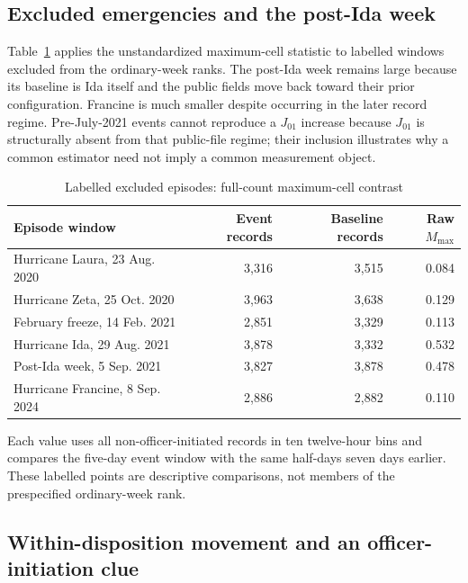 \documentclass[11pt]{article}
\begin{document}
\subsection{Excluded emergencies and the post-Ida week}

Table~\ref{tab:episodes} applies the unstandardized maximum-cell statistic to labelled windows excluded from the ordinary-week ranks. The post-Ida week remains large because its baseline is Ida itself and the public fields move back toward their prior configuration. Francine is much smaller despite occurring in the later record regime. Pre-July-2021 events cannot reproduce a $J_{01}$ increase because $J_{01}$ is structurally absent from that public-file regime; their inclusion illustrates why a common estimator need not imply a common measurement object.

\begin{table}[t]
\centering
\caption{Labelled excluded episodes: full-count maximum-cell contrast}
\label{tab:episodes}
\begin{tabular}{@{}lrrr@{}}
\toprule
Episode window & Event records & Baseline records & Raw $M_{\max}$ \\
\midrule
Hurricane Laura, 23 Aug. 2020 & 3,316 & 3,515 & 0.084 \\
Hurricane Zeta, 25 Oct. 2020 & 3,963 & 3,638 & 0.129 \\
February freeze, 14 Feb. 2021 & 2,851 & 3,329 & 0.113 \\
Hurricane Ida, 29 Aug. 2021 & 3,878 & 3,332 & 0.532 \\
Post-Ida week, 5 Sep. 2021 & 3,827 & 3,878 & 0.478 \\
Hurricane Francine, 8 Sep. 2024 & 2,886 & 2,882 & 0.110 \\
\bottomrule
\end{tabular}
\begin{minipage}{0.94\textwidth}\footnotesize
Each value uses all non-officer-initiated records in ten twelve-hour bins and compares the five-day event window with the same half-days seven days earlier. These labelled points are descriptive comparisons, not members of the prespecified ordinary-week rank.
\end{minipage}
\end{table}

\subsection{Within-disposition movement and an officer-initiation clue}
\end{document}
